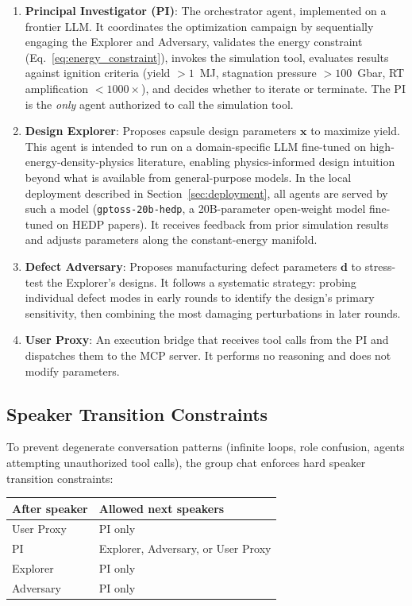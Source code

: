 \documentclass[conference]{IEEEtran}
\begin{document}
\begin{enumerate}
    \item \textbf{Principal Investigator (PI)}: The orchestrator agent, implemented on a frontier LLM.  It coordinates the optimization campaign by sequentially engaging the Explorer and Adversary, validates the energy constraint (Eq.~\ref{eq:energy_constraint}), invokes the simulation tool, evaluates results against ignition criteria (yield $> 1$~MJ, stagnation pressure $> 100$~Gbar, RT amplification $< 1000\times$), and decides whether to iterate or terminate.  The PI is the \textit{only} agent authorized to call the simulation tool.

    \item \textbf{Design Explorer}: Proposes capsule design parameters $\mathbf{x}$ to maximize yield.  This agent is intended to run on a domain-specific LLM fine-tuned on high-energy-density-physics literature, enabling physics-informed design intuition beyond what is available from general-purpose models.  In the local deployment described in Section~\ref{sec:deployment}, all agents are served by such a model (\texttt{gptoss-20b-hedp}, a 20B-parameter open-weight model fine-tuned on HEDP papers).  It receives feedback from prior simulation results and adjusts parameters along the constant-energy manifold.

    \item \textbf{Defect Adversary}: Proposes manufacturing defect parameters $\mathbf{d}$ to stress-test the Explorer's designs.  It follows a systematic strategy: probing individual defect modes in early rounds to identify the design's primary sensitivity, then combining the most damaging perturbations in later rounds.

    \item \textbf{User Proxy}: An execution bridge that receives tool calls from the PI and dispatches them to the MCP server.  It performs no reasoning and does not modify parameters.
\end{enumerate}

\subsection{Speaker Transition Constraints}

To prevent degenerate conversation patterns (infinite loops, role confusion, agents attempting unauthorized tool calls), the group chat enforces hard speaker transition constraints:

\begin{center}
\begin{tabular}{ll}
\toprule
\textbf{After speaker} & \textbf{Allowed next speakers} \\
\midrule
User Proxy & PI only \\
PI & Explorer, Adversary, or User Proxy \\
Explorer & PI only \\
Adversary & PI only \\
\bottomrule
\end{tabular}
\end{center}
\end{document}
